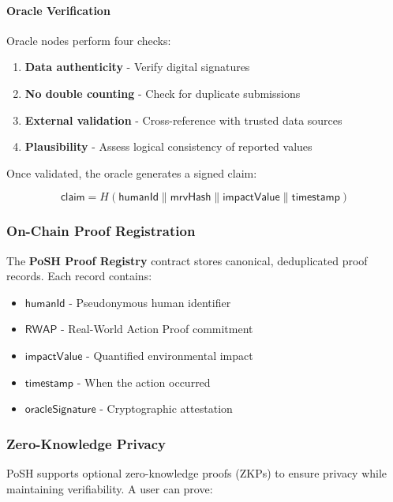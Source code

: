 \documentclass{article}
\begin{document}
\paragraph{Oracle Verification}

Oracle nodes perform four checks:

\begin{enumerate}
\item \textbf{Data authenticity} - Verify digital signatures
\item \textbf{No double counting} - Check for duplicate submissions
\item \textbf{External validation} - Cross-reference with trusted data sources
\item \textbf{Plausibility} - Assess logical consistency of reported values
\end{enumerate}

Once validated, the oracle generates a signed claim:

\begin{equation}
\mathsf{claim} = H(\mathsf{humanId} \parallel \mathsf{mrvHash} \parallel \mathsf{impactValue} \parallel \mathsf{timestamp})
\end{equation}

\subsubsection{On-Chain Proof Registration}

The \textbf{PoSH Proof Registry} contract stores canonical, deduplicated proof records. Each record contains:

\begin{itemize}
\item $\mathsf{humanId}$ - Pseudonymous human identifier
\item $\mathsf{RWAP}$ - Real-World Action Proof commitment
\item $\mathsf{impactValue}$ - Quantified environmental impact
\item $\mathsf{timestamp}$ - When the action occurred
\item $\mathsf{oracleSignature}$ - Cryptographic attestation
\end{itemize}

\subsubsection{Zero-Knowledge Privacy}

PoSH supports optional zero-knowledge proofs (ZKPs) to ensure privacy while maintaining verifiability. A user can prove:
\end{document}
